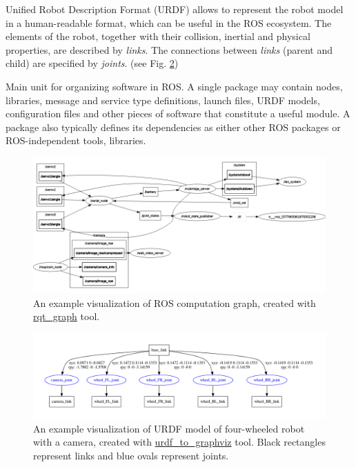 \documentclass[english,inz,shortabstract]{iithesis}
\begin{document}
\begin{description}[style=nextline]
		\item [URDF model]
		Unified Robot Description Format (URDF) allows to represent the robot model in a human-readable format, which can be useful in the ROS ecosystem. The elements of the robot, together with their collision, inertial and physical properties, are described by \textit{links}. The connections between \textit{links} (parent and child) are specified by \textit{joints}. (see Fig. \ref{fig:husky}) 
		\item [Packages]
		Main unit for organizing software in ROS. A single package may contain nodes, libraries, message and service type definitions, launch files, URDF models, configuration files and other pieces of software that constitute a useful module. A package also typically defines its dependencies as either other ROS packages or ROS-independent tools, libraries.

	\end{description}

	\begin{figure}[ht]
		\centering
		\captionsetup{margin=2cm}
		\includegraphics[width=\textwidth]{img/rqt_graph.png}
		\caption{An example visualization of ROS computation graph, created with  \href{http://wiki.ros.org/rqt_graph}{rqt\_graph} tool.}
		\label{fig:ros_graph}
	\end{figure}

	\begin{figure}[ht]
		\centering
		\captionsetup{margin=1cm}
		\includegraphics[width=\textwidth]{img/leo_description.pdf}
		\caption{An example visualization of URDF model of four-wheeled robot with a camera, created with \href{http://wiki.ros.org/urdf\#Visualization}{urdf\_to\_graphviz} tool. Black rectangles represent links and blue ovals represent joints.}
		\label{fig:husky}
	\end{figure}
\end{document}
